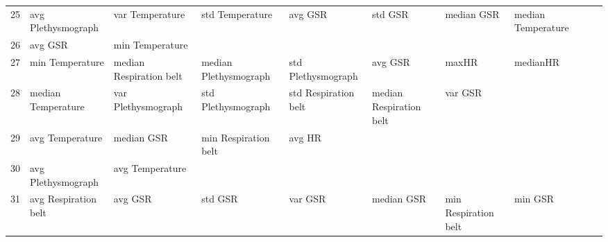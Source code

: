 \begin{landscape}
\begin{table}[]
\begin{tabular}{l|llllllll}
25       & avg Plethysmograph      & var Temperature         & std Temperature         & avg GSR                 & std GSR                 & median GSR            & median Temperature      &                         &                         &         \\
26       & avg GSR                 & min Temperature         &                         &                         &                         &                       &                         &                         &                         &         \\
27       & min Temperature         & median Respiration belt & median Plethysmograph   & std Plethysmograph      & avg GSR                 & maxHR                 & medianHR                &                         &                         &         \\
28       & median Temperature      & var Plethysmograph      & std Plethysmograph      & std Respiration belt    & median Respiration belt & var GSR               &                         &                         &                         &         \\
29       & avg Temperature         & median GSR              & min Respiration belt    & avg HR                  &                         &                       &                         &                         &                         &         \\
30       & avg Plethysmograph      & avg Temperature         &                         &                         &                         &                       &                         &                         &                         &         \\
31       & avg Respiration belt    & avg GSR                 & std GSR                 & var GSR                 & median GSR              & min Respiration belt  & min GSR                 &                         &                         &         \\
\end{tabular}
\end{table}
\end{landscape}
\clearpage

